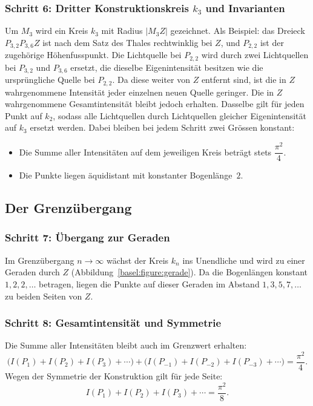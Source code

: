 % 
%


\subsubsection{Schritt 6: Dritter Konstruktionskreis $k_3$ und Invarianten}
Um $M_3$ wird ein Kreis $k_3$ mit Radius $|M_3 Z|$ gezeichnet.
Als Beispiel: das Dreieck $P_{3,2}P_{3,6}Z$ ist nach dem Satz des Thales
rechtwinklig bei $Z$, und $P_{2,2}$ ist der zugehörige Höhenfusspunkt.
Die Lichtquelle bei $P_{2,2}$ wird durch zwei Lichtquellen bei $P_{3,2}$
und $P_{3,6}$ ersetzt, die dieselbe Eigenintensität besitzen wie die
ursprüngliche Quelle bei $P_{2,2}$. Da diese weiter von $Z$ entfernt sind,
ist die in $Z$ wahrgenommene Intensität jeder einzelnen neuen Quelle geringer.
Die in $Z$ wahrgenommene Gesamtintensität bleibt jedoch erhalten.
Dasselbe gilt für jeden Punkt auf $k_2$, sodass alle Lichtquellen durch
Lichtquellen gleicher Eigenintensität auf $k_3$ ersetzt werden.
Dabei bleiben bei jedem Schritt zwei Grössen konstant:
\begin{itemize}
  \item Die Summe aller Intensitäten auf dem jeweiligen Kreis beträgt stets
        $\dfrac{\pi^2}{4}$.
  \item Die Punkte liegen äquidistant mit konstanter Bogenlänge~$2$.
\end{itemize}

% 
%


\subsection{Der Grenzübergang}
\label{basel:subsection:grenzuebergang}


 
\subsubsection{Schritt 7: Übergang zur Geraden}
Im Grenzübergang $n \to \infty$ wächst der Kreis $k_n$ ins Unendliche und
wird zu einer Geraden durch $Z$ (Abbildung~\ref{basel:figure:gerade}).
Da die Bogenlängen konstant $1, 2, 2, \ldots$ betragen, liegen die Punkte
auf dieser Geraden im Abstand $1, 3, 5, 7, \ldots$ zu beiden Seiten von $Z$.

\subsubsection{Schritt 8: Gesamtintensität und Symmetrie}
Die Summe aller Intensitäten bleibt auch im Grenzwert erhalten:
\[
    \bigl( I(P_1) + I(P_2) + I(P_3) + \cdots \bigr)
    +
    \bigl( I(P_{-1}) + I(P_{-2}) + I(P_{-3}) + \cdots \bigr)
    =
    \frac{\pi^2}{4}.
\]
Wegen der Symmetrie der Konstruktion gilt für jede Seite:
\[
    I(P_1) + I(P_2) + I(P_3) + \cdots = \frac{\pi^2}{8}.
\]

